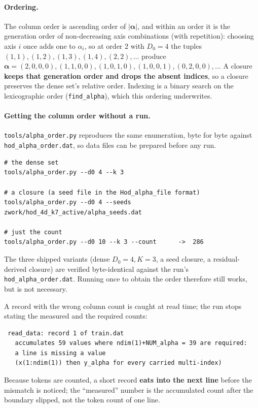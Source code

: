 \documentclass[10pt,a4paper]{article}
\newcommand{\code}[1]{\texttt{#1}}
\newcommand{\mi}[1]{\boldsymbol{#1}}
\begin{document}
\paragraph{Ordering.}
The column order is ascending order of $|\mi\alpha|$, and within an
order it is the generation order of non-decreasing axis combinations
(with repetition): choosing axis $i$ once adds one to $\alpha_i$, so
at order 2 with $D_0=4$ the tuples
$(1,1),(1,2),(1,3),(1,4),(2,2),\dots$ produce
$\mi\alpha=(2,0,0,0),(1,1,0,0),(1,0,1,0),(1,0,0,1),(0,2,0,0),\dots$
A closure \textbf{keeps that generation order and drops the absent
indices}, so a closure preserves the dense set's relative order.
Indexing is a binary search on the lexicographic order
(\code{find\_alpha}), which this ordering underwrites.

\paragraph{Getting the column order without a run.}
\code{tools/alpha\_order.py} reproduces the same enumeration, byte
for byte against \code{hod\_alpha\_order.dat}, so data files can be
prepared before any run.

\begin{verbatim}
# the dense set
tools/alpha_order.py --d0 4 --k 3

# a closure (a seed file in the Hod_alpha_file format)
tools/alpha_order.py --d0 4 --seeds zwork/hod_4d_k7_active/alpha_seeds.dat

# just the count
tools/alpha_order.py --d0 10 --k 3 --count      ->  286
\end{verbatim}

The three shipped variants (dense $D_0{=}4,K{=}3$, a seed closure, a
residual-derived closure) are verified byte-identical against the
run's \code{hod\_alpha\_order.dat}. Running once to obtain the order
therefore still works, but is not necessary.

A record with the wrong column count is caught at read time; the run
stops stating the measured and the required counts:

\begin{verbatim}
 read_data: record 1 of train.dat
   accumulates 59 values where ndim(1)+NUM_alpha = 39 are required:
   a line is missing a value
   (x(1:ndim(1)) then y_alpha for every carried multi-index)
\end{verbatim}

Because tokens are counted, a short record \textbf{eats into the next
line} before the mismatch is noticed; the ``measured'' number is the
accumulated count after the boundary slipped, not the token count of
one line.
\end{document}
